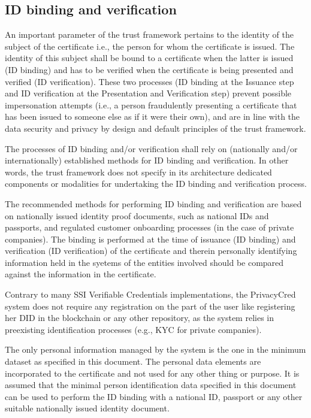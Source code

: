 \documentclass[letterpaper,10pt,english]{sphinxmanual}
\begin{document}
\subsection{ID binding and verification}
\label{\detokenize{privacycred:id-binding-and-verification}}
\sphinxAtStartPar
An important parameter of the trust framework pertains to the identity of the subject of the certificate i.e., the person for whom the certificate is issued. The identity of this subject shall be bound to a certificate when the latter is issued (ID binding) and has to be verified when the certificate is being presented and verified (ID verification). These two processes (ID binding at the Issuance step and ID verification at the Presentation and Verification step) prevent possible impersonation attempts (i.e., a person fraudulently presenting a certificate that has been issued to someone else as if it were their own), and are in line with the data security and privacy by design and default principles of the trust framework.

\sphinxAtStartPar
The processes of ID binding and/or verification shall rely on (nationally and/or internationally) established methods for ID binding and verification. In other words, the trust framework does not specify in its architecture dedicated components or modalities for undertaking the ID binding and verification process.

\sphinxAtStartPar
The recommended methods for performing ID binding and verification are based on nationally issued identity proof documents, such as national IDs and passports, and regulated customer onboarding processes (in the case of private companies). The binding is performed at the time of issuance (ID binding) and verification (ID verification) of the certificate and therein personally identifying information held in the syetems of the entities involved should be compared against the information in the certificate.

\sphinxAtStartPar
Contrary to many SSI Verifiable Credentials implementations, the PrivacyCred system does not require any registration on the part of the user like registering her DID in the blockchain or any other repository, as the system relies in pre\sphinxhyphen{}existing identification processes (e.g., KYC for private companies).

\sphinxAtStartPar
The only personal information managed by the system is the one in the minimum dataset as specified in this document.
The personal data elements are incorporated to the certificate and not used for any other thing or purpose.
It is assumed that the minimal person identification data specified in this document can be used to perform the ID binding with a national ID, passport or any other suitable nationally issued identity document.
\end{document}
